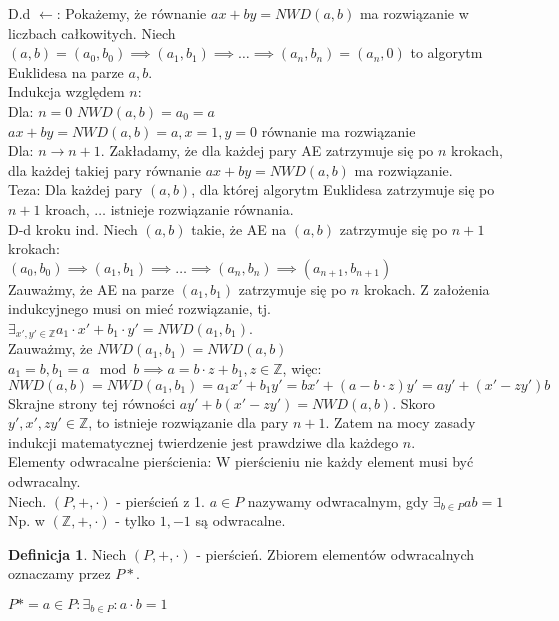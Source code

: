 \documentclass{article}
\theoremstyle{definition}
\newtheorem{de}{Definicja}[subsection]
\theoremstyle{definition}
\theoremstyle{definition}
\theoremstyle{definition}
\begin{document}
D.d $\leftarrow$:
Pokażemy, że równanie $ax+by=NWD(a,b)$ ma rozwiązanie w liczbach całkowitych. 
Niech $(a,b)=(a_0,b_0)\implies(a_1,b_1)\implies\dots\implies(a_n, b_n)=(a_n,0)$ to algorytm Euklidesa na parze $a, b$.\\
Indukcja względem $n$:\\
Dla: $n=0$ $NWD(a,b)=a_0=a$\\
$ax+by=NWD(a,b)=a, x=1, y=0$ równanie ma rozwiązanie\\
Dla: $n \rightarrow n+1$. Zakładamy, że dla każdej pary AE zatrzymuje się po $n$ krokach, dla każdej takiej pary równanie $ax+by=NWD(a,b)$ ma rozwiązanie.\\
Teza: Dla każdej pary $(a,b)$, dla której algorytm Euklidesa zatrzymuje się po $n+1$ kroach, $\dots$ istnieje rozwiązanie równania.\\
D-d kroku ind. Niech $(a,b)$ takie, że AE na $(a,b)$ zatrzymuje się po $n+1$ krokach:\\
$(a_0,b_0)\implies(a_1,b_1)\implies\dots \implies(a_n,b_n)\implies(a_{n+1},b_{n+1})$\\
Zauważmy, że AE na parze $(a_1,b_1)$ zatrzymuje się po $n$ krokach. Z założenia indukcyjnego musi on mieć rozwiązanie, tj. $\exists_{x', y' \in \mathbb{Z}} a_1\cdot x' + b_1\cdot y' = NWD(a_1,b_1)$.\\
Zauważmy, że $NWD(a_1,b_1)=NWD(a,b)$\\
$a_1=b, b_1=a \mod b \implies a = b \cdot z + b_1, z\in\mathbb{Z}$, więc:\\
$NWD(a,b)=NWD(a_1,b_1)=a_1 x' + b_1 y' = b x' + (a-b\cdot z) y' = a y' + (x' - zy') b$\\
Skrajne strony tej równości $ay' + b(x'-zy')=NWD(a,b)$. Skoro $y', x', zy' \in \mathbb{Z}$, to istnieje
rozwiązanie dla pary $n+1$. Zatem na mocy zasady indukcji matematycznej twierdzenie jest prawdziwe dla każdego $n$.\\

Elementy odwracalne pierścienia:
W pierścieniu nie każdy element musi być odwracalny.\\
Niech. $(P, +, \cdot)$ - pierścień z 1.
$a\in P$ nazywamy odwracalnym, gdy $\exists_{b\in P} ab = 1$\\
Np. w $(\mathbb{Z},+,\cdot)$ - tylko $1, -1$ są odwracalne.

\begin{de}
    Niech $(P,+,\cdot)$ - pierścień. Zbiorem elementów odwracalnych oznaczamy przez $P*$.
    \begin{center}
        $P* = {a\in P : \exists_{b\in P}: a\cdot b = 1}$
    \end{center}
\end{de}
\end{document}
